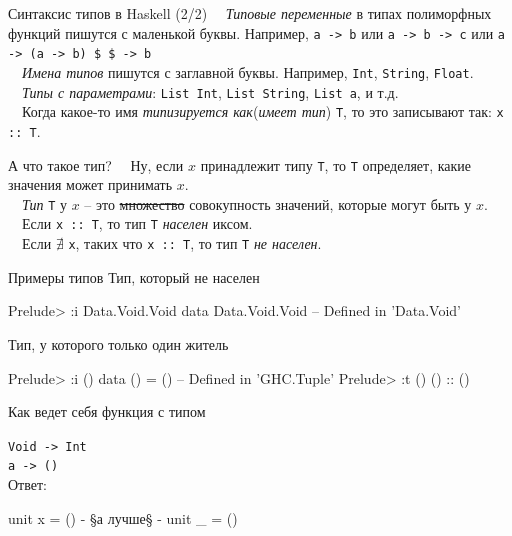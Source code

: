 \documentclass{beamer}
\newcommand{\inline}[1]{\lstinline{haskell}{#1}}
\def\hsinline{\lstinline[style={hsstyle1}]}
\def\inline{\hsinline}
\def\faQuestion{{\FA\symbol{"F128}}}
\begin{document}
\begin{frame}{Синтаксис типов в Haskell (2/2)}
~\ \emph{Типовые переменные} в типах полиморфных функций пишутся с маленькой буквы. Например, \inline{a -> b} или \inline{a -> b -> c} или 
\inline=a -> (a -> b) $ $ -> b=
\vspace{0.5cm} 
\\ \pause
~\ \emph{Имена типов} пишутся с заглавной буквы. Например,  \inline=Int=, \inline=String=, \inline=Float=.
\vspace{0.5cm} 
\\ \pause
~\ \emph{Типы с параметрами}: \inline=List Int=, \inline=List String=, \inline=List a=, и т.д. 
\vspace{0.5cm} 
\\ \pause
~\ Когда какое-то имя \emph{типизируется как}(\emph{имеет тип}) \inline=T=, то это записывают так: \inline=x :: T=.
\end{frame}

\begin{frame}[fragile]{А что такое тип?}
~\ Ну, если $x$ принадлежит типу \inline=T=, то \inline=T= определяет, какие значения может принимать $x$.
\\ \vspace{0.5cm} %
~\ \emph{Тип} \inline=T= у $x$ -- это \sout{множество} совокупность значений, которые могут быть у $x$.
\vspace{0.5cm} \\ %
~\  Если \inline=x :: T=, то тип \inline=T= \emph{населен} иксом.
\\ \vspace{0.5cm} %
~\ Если $\nexists$ \inline=x=, таких что \inline=x :: T=, то тип \inline=T= \emph{не населен}.
\end{frame}

\begin{frame}[fragile]{Примеры типов}
Тип, который не населен
\begin{hslisting}
Prelude> :i Data.Void.Void
data Data.Void.Void        -- Defined in 'Data.Void'
\end{hslisting}

Тип, у которого только один житель
\begin{hslisting}
Prelude> :i ()
data () = ()               -- Defined in 'GHC.Tuple'
Prelude> :t ()
() :: ()
\end{hslisting}
\end{frame}

\begin{frame}[fragile]{Как ведет себя функция с типом}

{\Large \faQuestion} \inline=Void -> Int= \\
\vspace{1cm}
{\large \faQuestion} \inline=a -> ()= \\
\vspace{0.5cm}
Ответ:
\begin{hslisting}
unit x = ()
{- §а лучше§ -}
unit _ = ()
\end{hslisting}
\end{frame}
\end{document}
